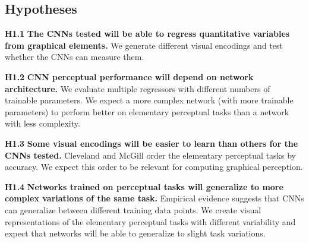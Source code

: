 %
\subsection{Hypotheses}

\begin{hypolist}
\item \textbf{H1.1} \textbf{The CNNs tested will be able to regress quantitative variables from graphical elements.} We generate different visual encodings %
and test whether the CNNs can measure them. %

\item \textbf{H1.2} \textbf{CNN perceptual performance will depend on network architecture.} We evaluate multiple regressors with different numbers of trainable parameters. We expect a more complex network (with more trainable parameters) to perform better on elementary perceptual tasks than a network with less complexity.

\item \textbf{H1.3} \textbf{Some visual encodings will be easier to learn than others for the CNNs tested.} Cleveland and McGill order the elementary perceptual tasks by accuracy. We expect this order to be relevant for computing graphical perception.

\item \textbf{H1.4} \textbf{Networks trained on perceptual tasks will generalize to more complex variations of the same task.} Empirical evidence suggests that CNNs can generalize between different training data points. We create visual representations of the elementary perceptual tasks with different variability and expect that networks will be able to generalize to slight task variations.
\end{hypolist}

%	
%	

